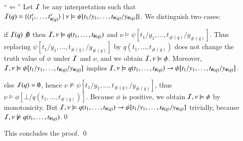 {{    \noindent``$\Leftarrow$'' Let $\mathcal{I}$ be any interpretation such that
    $\mathcal{I}(q) = \{ \langle t_1^\nu, \ldots, t_{\#(q)}^\nu \rangle \mid \nu
      \models \psi[t_1/y_1,\ldots,t_{\#(q)}/y_{\#(q)}] \}$. We
    distinguish two cases: \begin{compactitem}
      \item if $\mathcal{I}(q) \not \emptyset$ then $\mathcal{I},\nu \models
        q(t_1,\ldots,t_{\#(q)})$ and $\nu \models \psi[t_1/y_1,
          \ldots, t_{\#(q)}/y_{\#(q)}]$. Thus replacing $\psi[t_1/y_1,
          \ldots, t_{\#(q)}/y_{\#(q)}]$ by $q(t_1,\ldots,t_{\#(q)})$
        does not change the truth value of $\phi$ under $\mathcal{I}$ and
        $\nu$, and we obtain $\mathcal{I},\nu \models \phi$. Moreover, $\mathcal{I},\nu
        \models \psi[t_1/y_1, \ldots, t_{\#(q)}/y_{\#(q)}]$ implies
        $\mathcal{I},\nu \models q(t_1,\ldots,t_{\#(q)}) \rightarrow
        \psi[t_1/y_1, \ldots, t_{\#(q)}/y_{\#(q)}]$.
      \item else $\mathcal{I}(q) = \emptyset$, hence $\nu \not\models
        \psi[t_1/y_1, \ldots, t_{\#(q)}/y_{\#(q)}]$, thus $\nu \models
        \phi[\bot/q(t_1,\ldots,t_{\#(q)})]$. Because $\phi$ is
        positive, we obtain $\mathcal{I},\nu \models \phi$ by monotonicity. But
        $\mathcal{I},\nu \models q(t_1,\ldots,t_{\#(q)}) \rightarrow
        \psi[t_1/y_1, \ldots, t_{\#(q)}/y_{\#(q)}]$ trivially, because
        $\mathcal{I},\nu \not\models q(t_1,\ldots,t_{\#(q)})$.\qed
    \end{compactitem}}
This concludes the proof. \qed}

